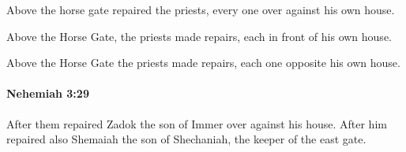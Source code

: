 			\begin{versebox}
					\item[BHS] 
					\item[LXX] 
					\item[ASV] Above the horse gate repaired the priests, every one over against his own house.
					\item[NIV] Above the Horse Gate, the priests made repairs, each in front of his own house.
					\item[NRSV] Above the Horse Gate the priests made repairs, each one opposite his own house.
			\end{versebox}

		\paragraph{Nehemiah 3:29} %
			\label{NEHEMIAH-3-29}

			After them repaired Zadok the son of Immer over against his house. After him repaired also Shemaiah the son of Shechaniah, the keeper of the east gate.

